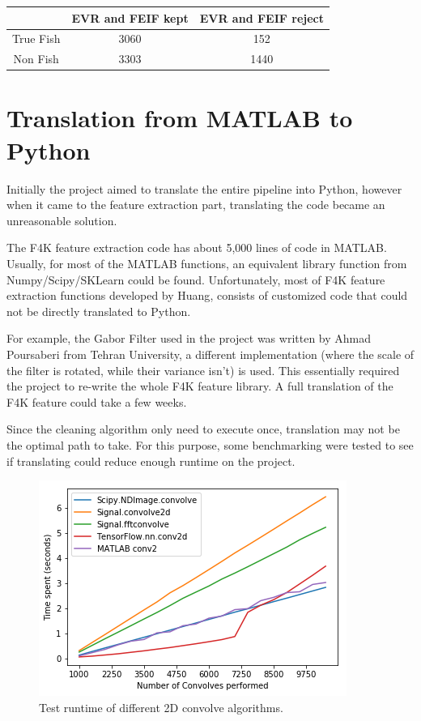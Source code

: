 \documentclass[bsc,logo,twoside,fullspacing,parskip]{infthesis}
\begin{document}
\begin{center}
\begin{tabular}{|c|c|c|}
\hline 
$ $ & EVR and FEIF kept & EVR and FEIF reject \\
\hline 
True Fish & 3060 & 152 \\
Non Fish & 3303 & 1440 \\
\hline 
\end{tabular}
\end{center}

\section{Translation from MATLAB to Python}
\label{sec:translate}

Initially the project aimed to translate the entire pipeline into Python, however when it came to the feature extraction part, translating the code became an unreasonable solution.

The F4K feature extraction code has about 5,000 lines of code in MATLAB.
Usually, for most of the MATLAB functions, an equivalent library function from Numpy/Scipy/SKLearn could be found.
Unfortunately, most of F4K feature extraction functions developed by Huang\cite{Huang}, consists of customized code that could not be directly translated to Python.

For example, the Gabor Filter used in the project was written by Ahmad Poursaberi from Tehran University, a different implementation (where the scale of the filter is rotated, while their variance isn't) is used. 
This essentially required the project to re-write the whole F4K feature library.
A full translation of the F4K feature could take a few weeks. 

Since the cleaning algorithm only need to execute once, translation may not be the optimal path to take. 
For this purpose, some benchmarking were tested to see if translating could reduce enough runtime on the project.

\begin{figure}[h]
    \centering
    \includegraphics[scale=0.5]{graph/benchmark.png}
    \caption{Test runtime of different 2D convolve algorithms.}
    \label{fig:benchmark}
\end{figure}
\end{document}
